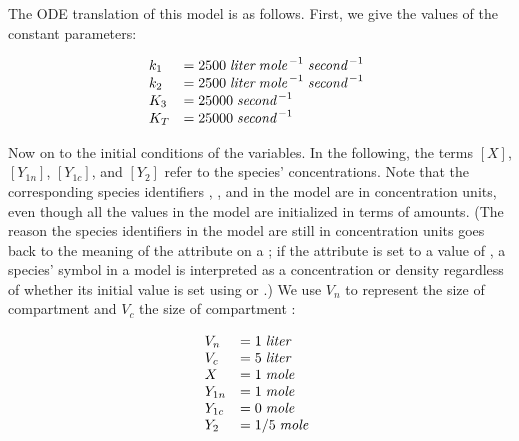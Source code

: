 The ODE translation of this model is as follows.  First, we give
the values of the constant parameters:
\begin{linenomath}
  \begin{equation*}
    \begin{array}{@{}lll@{}}
      k_1   & = 2500\; \emph{liter} \; \emph{mole}^{\,-1}\; \emph{second}^{\,-1}\\
      k_2   & = 2500\; \emph{liter} \; \emph{mole}^{\,-1}\; \emph{second}^{\,-1}\\
      K_3   & = 25000\; \emph{second}^{\,-1}\\
      K_T   & = 25000\; \emph{second}^{\,-1}\\
    \end{array}
  \end{equation*}
\end{linenomath}
Now on to the initial conditions of the variables.  In the
following, the terms $[X]$, $[Y_{1n}]$, $[Y_{1c}]$, and $[Y_2]$
refer to the species' concentrations.  Note that the corresponding
species identifiers , , 
and  in the model are in concentration units, even
though all the values in the model are initialized in terms of
amounts.  (The reason the species identifiers in the model are
still in concentration units goes back to the meaning of the
 attribute on a \Species; if the
attribute is set to a value of , a species' symbol in a
model is interpreted as a concentration or density regardless of
whether its initial value is set using  or
.)  We use $V_n$ to represent the size
of compartment  and $V_c$ the size of compartment
:
\begin{linenomath}
  \begin{equation*}
    \begin{array}{@{}lll@{}}
      V_n    & = 1\; \emph{liter}\\
      V_c    & = 5\; \emph{liter}\\
      X      & = 1\; \emph{mole}\\
      Y_{1n} & = 1\; \emph{mole}\\
      Y_{1c} & = 0\; \emph{mole}\\
      Y_2    & = 1/5\; \emph{mole}\\
    \end{array}
  \end{equation*}
\end{linenomath}
